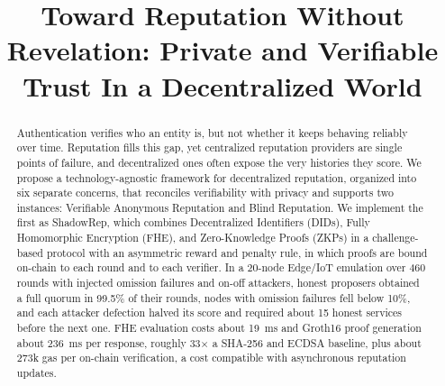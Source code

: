 \documentclass[conference]{IEEEtran}
\begin{document}
\title{Toward Reputation Without Revelation: Private and Verifiable Trust In a Decentralized World}

\author{
\and
{}
\and
{}
}

\maketitle

\begin{abstract}
Authentication verifies who an entity is, but not whether it keeps behaving reliably over time. Reputation fills this gap, yet centralized reputation providers are single points of failure, and decentralized ones often expose the very histories they score. We propose a technology-agnostic framework for decentralized reputation, organized into six separate concerns, that reconciles verifiability with privacy and supports two instances: Verifiable Anonymous Reputation and Blind Reputation. We implement the first as ShadowRep, which combines Decentralized Identifiers (DIDs), Fully Homomorphic Encryption (FHE), and Zero-Knowledge Proofs (ZKPs) in a challenge-based protocol with an asymmetric reward and penalty rule, in which proofs are bound on-chain to each round and to each verifier. In a 20-node Edge/IoT emulation over 460 rounds with injected omission failures and on-off attackers, honest proposers obtained a full quorum in 99.5\% of their rounds, nodes with omission failures fell below 10\%, and each attacker defection halved its score and required about 15 honest services before the next one. FHE evaluation costs about 19~ms and Groth16 proof generation about 236~ms per response, roughly 33$\times$ a SHA-256 and ECDSA baseline, plus about 273k gas per on-chain verification, a cost compatible with asynchronous reputation updates.
\end{abstract}
\end{document}
